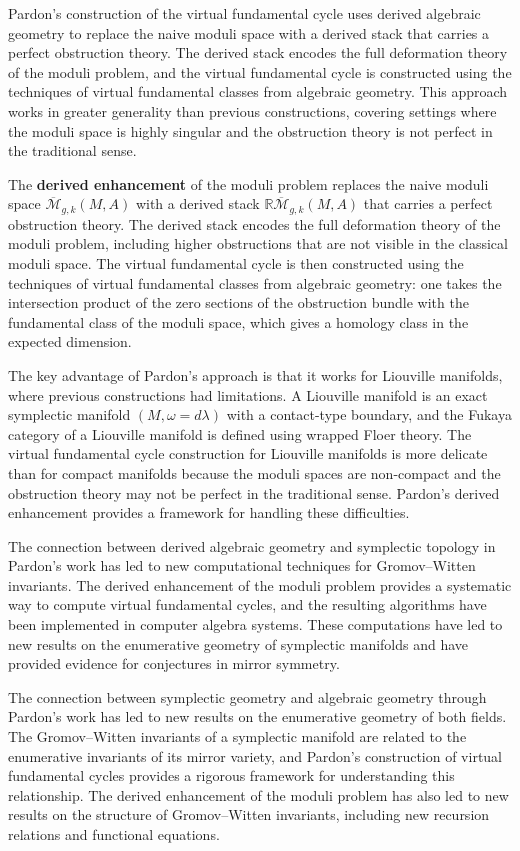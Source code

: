 Pardon's construction of the virtual fundamental cycle uses derived algebraic geometry to replace the naive moduli space with a derived stack that carries a perfect obstruction theory. The derived stack encodes the full deformation theory of the moduli problem, and the virtual fundamental cycle is constructed using the techniques of virtual fundamental classes from algebraic geometry. This approach works in greater generality than previous constructions, covering settings where the moduli space is highly singular and the obstruction theory is not perfect in the traditional sense.

The \textbf{derived enhancement} of the moduli problem replaces the naive moduli space $\overline{\mathcal{M}}_{g,k}(M,A)$ with a derived stack $\mathbb{R}\overline{\mathcal{M}}_{g,k}(M,A)$ that carries a perfect obstruction theory. The derived stack encodes the full deformation theory of the moduli problem, including higher obstructions that are not visible in the classical moduli space. The virtual fundamental cycle is then constructed using the techniques of virtual fundamental classes from algebraic geometry: one takes the intersection product of the zero sections of the obstruction bundle with the fundamental class of the moduli space, which gives a homology class in the expected dimension.

The key advantage of Pardon's approach is that it works for Liouville manifolds, where previous constructions had limitations. A Liouville manifold is an exact symplectic manifold $(M, \omega = d\lambda)$ with a contact-type boundary, and the Fukaya category of a Liouville manifold is defined using wrapped Floer theory. The virtual fundamental cycle construction for Liouville manifolds is more delicate than for compact manifolds because the moduli spaces are non-compact and the obstruction theory may not be perfect in the traditional sense. Pardon's derived enhancement provides a framework for handling these difficulties.

The connection between derived algebraic geometry and symplectic topology in Pardon's work has led to new computational techniques for Gromov--Witten invariants. The derived enhancement of the moduli problem provides a systematic way to compute virtual fundamental cycles, and the resulting algorithms have been implemented in computer algebra systems. These computations have led to new results on the enumerative geometry of symplectic manifolds and have provided evidence for conjectures in mirror symmetry.

The connection between symplectic geometry and algebraic geometry through Pardon's work has led to new results on the enumerative geometry of both fields. The Gromov--Witten invariants of a symplectic manifold are related to the enumerative invariants of its mirror variety, and Pardon's construction of virtual fundamental cycles provides a rigorous framework for understanding this relationship. The derived enhancement of the moduli problem has also led to new results on the structure of Gromov--Witten invariants, including new recursion relations and functional equations.

